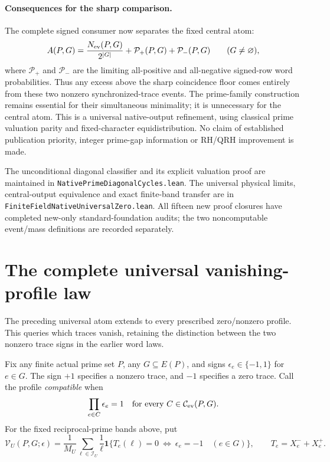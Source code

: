 \documentclass[11pt]{article}
\begin{document}
\paragraph{Consequences for the sharp comparison.}
The complete signed consumer now separates the fixed central atom:
\[
 A(P,G)=\frac{N_{\rm ev}(P,G)}{2^{|G|}}
   +\mathcal P_{+}(P,G)+\mathcal P_{-}(P,G)
 \qquad(G\ne\varnothing),
\]
where \(\mathcal P_{+}\) and \(\mathcal P_{-}\) are the limiting
all-positive and all-negative signed-row word probabilities.
Thus any excess above the sharp coincidence floor comes entirely
from these two nonzero synchronized-trace events.
The prime-family construction remains essential for their simultaneous
minimality; it is unnecessary for the central atom.
This is a universal native-output refinement, using classical prime
valuation parity and fixed-character equidistribution.
No claim of established publication priority, integer prime-gap
information or RH/QRH improvement is made.

The unconditional diagonal classifier and its explicit valuation proof
are maintained in \texttt{NativePrimeDiagonalCycles.lean}.
The universal physical limits, central-output equivalence and exact
finite-band transfer are in \texttt{FiniteFieldNativeUniversalZero.lean}.
All fifteen new proof closures have completed new-only
standard-foundation audits; the two noncomputable event/mass definitions
are recorded separately.

\section{The complete universal vanishing-profile law}
\label{sec:native-vanishing-profiles}

The preceding universal atom extends to every prescribed zero/nonzero
profile. This queries which traces vanish, retaining the distinction
between the two nonzero trace signs in the earlier word laws.

Fix any finite actual prime set \(P\), any \(G\subseteq E(P)\), and
signs \(\epsilon_e\in\{-1,1\}\) for \(e\in G\).
The sign \(+1\) specifies a nonzero trace, and \(-1\) specifies a zero
trace. Call the profile \emph{compatible} when
\begin{equation}\label{eq:native-profile-compatibility}
 \prod_{e\in C}\epsilon_e=1
 \quad\text{for every }C\in\mathcal C_{\rm ev}(P,G).
\end{equation}
For the fixed reciprocal-prime bands above, put
\[
 \mathcal V_U(P,G;\epsilon)=\frac1{M_U}
  \sum_{\ell\in\mathcal I_U}\frac1\ell
  \mathbf1\{T_e(\ell)=0\ \Longleftrightarrow\
                          \epsilon_e=-1\quad(e\in G)\},
 \qquad T_e=X^-_e+X^+_e.
\]
\end{document}
